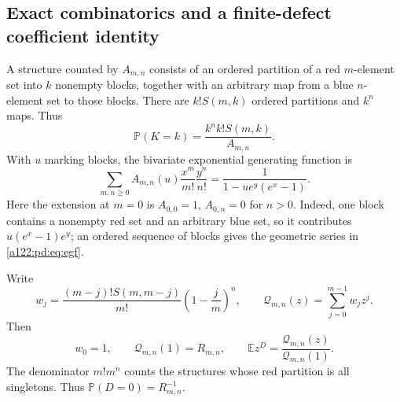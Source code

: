\documentclass[11pt,letterpaper]{article}
\numberwithin{equation}{subsection}
\theoremstyle{definition}
\theoremstyle{remark}
\theoremstyle{plain}
\newcommand{\E}{\mathbb E}
\newcommand{\Prob}{\mathbb P}
\newcommand{\cQ}{\mathcal Q}
\begin{document}
\subsection{Exact combinatorics and a finite-defect coefficient identity}
\label{a122:pd:sec:exact}
A structure counted by $A_{m,n}$ consists of an ordered partition of a
red $m$-element set into $k$ nonempty blocks, together with an arbitrary
map from a blue $n$-element set to those blocks. There are $k!S(m,k)$
ordered partitions and $k^n$ maps. Thus
\begin{equation}\label{a122:pd:eq:law}
 \Prob(K=k)=\frac{k^n k!S(m,k)}{A_{m,n}}.
\end{equation}
With $u$ marking blocks, the bivariate exponential generating function is
\begin{equation}\label{a122:pd:eq:egf}
 \sum_{m,n\ge0} A_{m,n}(u)\frac{x^m}{m!}\frac{y^n}{n!}
 =\frac1{1-u e^y(e^x-1)}.
\end{equation}
Here the extension at $m=0$ is $A_{0,0}=1$, $A_{0,n}=0$ for $n>0$.
Indeed, one block contains a nonempty red set and an arbitrary blue set,
so it contributes $u(e^x-1)e^y$; an ordered sequence of blocks gives the
geometric series in \eqref{a122:pd:eq:egf}.

Write
\begin{equation}\label{a122:pd:eq:Qdef}
 w_j=\frac{(m-j)!S(m,m-j)}{m!}\left(1-\frac jm\right)^n,
 \qquad
 \cQ_{m,n}(z)=\sum_{j=0}^{m-1}w_jz^j.
\end{equation}
Then
\begin{equation}\label{a122:pd:eq:Qlaw}
 w_0=1,\qquad \cQ_{m,n}(1)=R_{m,n},\qquad
 \E z^D=\frac{\cQ_{m,n}(z)}{\cQ_{m,n}(1)}.
\end{equation}
The denominator $m!m^n$ counts the structures whose red partition is all
singletons. Thus $\Prob(D=0)=R_{m,n}^{-1}$.
\end{document}
